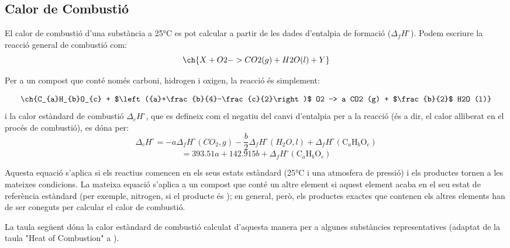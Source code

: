 \documentclass{report}
\begin{document}
\subsection*{Calor de Combustió}

El calor de combustió d'una substància a 25°C es pot calcular a partir de les dades d'entalpia de formació (\(\Delta_f H^\circ\)). Podem escriure la reacció general de combustió com:
\[ \ch{X + O2 -> CO2 (g) + H2O (l) + Y} \]

Per a un compost que conté només carboni, hidrogen i oxigen, la reacció és simplement:

\[
\ch{C_{a}H_{b}O_{c} + $\left({a}+\frac{b}{4}-\frac{c}{2}\right)$ O2 -> a CO2 (g) + $\frac{b}{2}$ H2O (l)}
\]
i la calor estàndard de combustió \(\Delta_c H^\circ\), que es defineix com el negatiu del canvi d'entalpia per a la reacció (és a dir, el calor alliberat en el procés de combustió), es dóna per:
\[ \Delta_c H^\circ = -a \Delta_f H^\circ (CO_2, g) - \frac{b}{2} \Delta_f H^\circ (H_2O, l) + \Delta_f H^\circ (\text{C}_a \text{H}_b \text{O}_c) \]
\[ = 393.51a + 142.915b + \Delta_f H^\circ (\text{C}_a \text{H}_b \text{O}_c) \]

Aquesta equació s'aplica si els reactius comencen en els seus estats estàndard (25°C i una atmosfera de pressió) i els productes tornen a les mateixes condicions. La mateixa equació s'aplica a un compost que conté un altre element si aquest element acaba en el seu estat de referència estàndard (per exemple, nitrogen, si el producte és ); en general, però, els productes exactes que contenen els altres elements han de ser coneguts per calcular el calor de combustió.

La taula següent dóna la calor estàndard de combustió calculat d'aquesta manera per a algunes substàncies representatives (adaptat de la taula "Heat of Combustion" a \cite{lide_crc_2005}).
\end{document}
